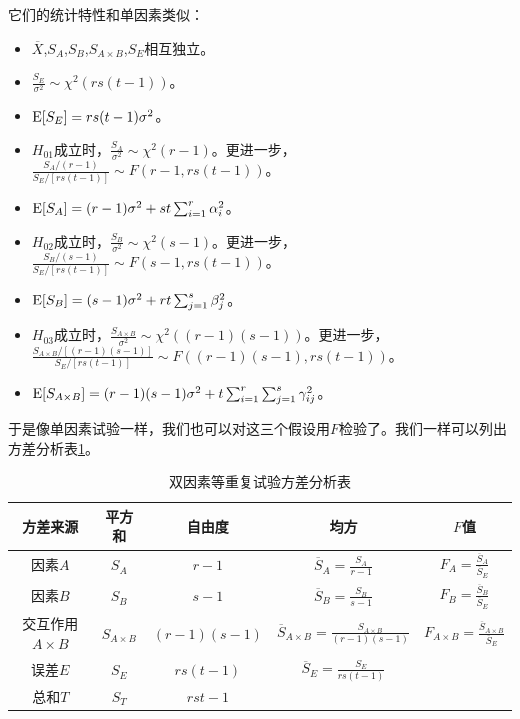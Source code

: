 它们的统计特性和单因素类似：
\begin{itemize}
    \item $\overline{X}$,$S_A$,$S_B$,$S_{A\times B}$,$S_E$相互独立。
    \item $\frac{S_E}{\sigma^2}\sim \chi^2(rs(t-1))$。
    \item $\operatorname{E}[S_E]=rs(t-1)\sigma^2$。
    \item $H_{01}$成立时，$\frac{S_A}{\sigma^2}\sim \chi^2(r-1)$。更进一步，$\frac{S_A/(r-1)}{S_E/[rs(t-1)]} \sim F(r-1,rs(t-1))$。
    \item $\operatorname{E}[S_A]=(r-1)\sigma^2+st\sum_{i=1}^r \alpha_i^2$。
    
    \item $H_{02}$成立时，$\frac{S_B}{\sigma^2}\sim \chi^2(s-1)$。更进一步，$\frac{S_B/(s-1)}{S_E/[rs(t-1)]} \sim F(s-1,rs(t-1))$。
    \item $\operatorname{E}[S_B]=(s-1)\sigma^2+rt\sum_{j=1}^s \beta_j^2$。
    
    \item $H_{03}$成立时，$\frac{S_{A\times B}}{\sigma^2}\sim \chi^2((r-1)(s-1))$。更进一步，$\frac{S_{A\times B}/[(r-1)(s-1)]}{S_E/[rs(t-1)]} \sim F((r-1)(s-1),rs(t-1))$。
    \item $\operatorname{E}[S_{A\times B}]=(r-1)(s-1)\sigma^2+t\sum_{i=1}^r\sum_{j=1}^s\gamma_{ij}^2$。
\end{itemize}

于是像单因素试验一样，我们也可以对这三个假设用$F$检验了。我们一样可以列出方差分析表\ref{tab:two-way-anova}。

\begin{table}[htbp]
    \centering
    \renewcommand{\arraystretch}{1.5}
    \begin{tabular}{c|c|c|c|c}
    \hline
    方差来源    & 平方和 & 自由度 & 均方 & $F$值 \\
    \hline
    因素$A$      & $S_A$   & $r-1$     & $\overline{S}_A = \frac{S_A}{r-1}$ & $F_A = \frac{\overline{S}_A}{\overline{S}_E}$ \\
    \hline
    因素$B$      & $S_B$   & $s-1$     & $\overline{S}_B = \frac{S_B}{s-1}$ & $F_B = \frac{\overline{S}_B}{\overline{S}_E}$ \\
    \hline
    交互作用$A\times B$ & $S_{A\times B}$ & $(r-1)(s-1)$ & $\overline{S}_{A\times B} = \frac{S_{A\times B}}{(r-1)(s-1)}$ & $F_{A\times B} = \frac{\overline{S}_{A\times B}}{\overline{S}_E}$ \\
    \hline
    误差$E$      & $S_E$   & $rs(t-1)$ & $\overline{S}_E = \frac{S_E}{rs(t-1)}$ & \\
    \hline
    总和$T$      & $S_T$   & $rst-1$   & & \\
    \hline
    \end{tabular}
    \caption{双因素等重复试验方差分析表}
    \label{tab:two-way-anova}
\end{table}
